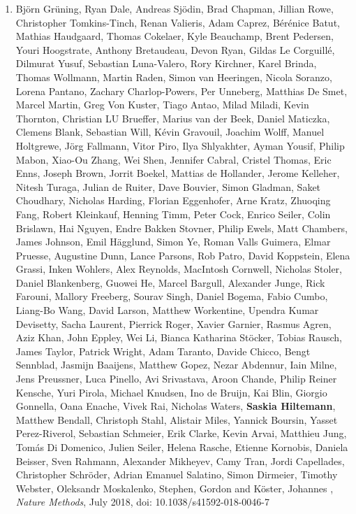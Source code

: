 \begin{enumerate}
\item Björn Grüning, Ryan  Dale, Andreas  Sjödin, Brad  Chapman, Jillian  Rowe, Christopher  Tomkins-Tinch, Renan  Valieris, Adam  Caprez, Bérénice  Batut, Mathias  Haudgaard, Thomas  Cokelaer, Kyle  Beauchamp, Brent  Pedersen, Youri  Hoogstrate, Anthony  Bretaudeau, Devon  Ryan, Gildas  Le Corguillé, Dilmurat  Yusuf, Sebastian  Luna-Valero, Rory  Kirchner, Karel  Brinda, Thomas  Wollmann, Martin  Raden, Simon  van Heeringen, Nicola  Soranzo, Lorena  Pantano, Zachary  Charlop-Powers, Per  Unneberg, Matthias  De Smet, Marcel  Martin, Greg  Von Kuster, Tiago  Antao, Milad  Miladi, Kevin  Thornton, Christian LU   Brueffer, Marius  van der Beek, Daniel  Maticzka, Clemens  Blank, Sebastian  Will, Kévin  Gravouil, Joachim  Wolff, Manuel  Holtgrewe, Jörg  Fallmann, Vitor  Piro, Ilya  Shlyakhter, Ayman  Yousif, Philip  Mabon, Xiao-Ou  Zhang, Wei  Shen, Jennifer  Cabral, Cristel  Thomas, Eric  Enns, Joseph  Brown, Jorrit  Boekel, Mattias  de Hollander, Jerome  Kelleher, Nitesh  Turaga, Julian  de Ruiter, Dave  Bouvier, Simon  Gladman, Saket  Choudhary, Nicholas  Harding, Florian  Eggenhofer, Arne  Kratz, Zhuoqing  Fang, Robert  Kleinkauf, Henning  Timm, Peter  Cock, Enrico  Seiler, Colin  Brislawn, Hai  Nguyen, Endre  Bakken Stovner, Philip  Ewels, Matt  Chambers, James  Johnson, Emil  Hägglund, Simon  Ye, Roman  Valls Guimera, Elmar  Pruesse, Augustine  Dunn, Lance  Parsons, Rob  Patro, David  Koppstein, Elena  Grassi, Inken  Wohlers, Alex  Reynolds, MacIntosh  Cornwell, Nicholas  Stoler, Daniel  Blankenberg, Guowei  He, Marcel  Bargull, Alexander  Junge, Rick  Farouni, Mallory  Freeberg, Sourav  Singh, Daniel  Bogema, Fabio  Cumbo, Liang-Bo  Wang, David  Larson, Matthew  Workentine, Upendra  Kumar Devisetty, Sacha  Laurent, Pierrick  Roger, Xavier  Garnier, Rasmus  Agren, Aziz  Khan, John  Eppley, Wei  Li, Bianca Katharina  Stöcker, Tobias  Rausch, James  Taylor, Patrick  Wright, Adam  Taranto, Davide  Chicco, Bengt  Sennblad, Jasmijn  Baaijens, Matthew  Gopez, Nezar  Abdennur, Iain  Milne, Jens  Preussner, Luca  Pinello, Avi  Srivastava, Aroon  Chande, Philip Reiner  Kensche, Yuri  Pirola, Michael  Knudsen, Ino  de Bruijn, Kai  Blin, Giorgio  Gonnella, Oana  Enache, Vivek  Rai, Nicholas  Waters, \textbf{Saskia Hiltemann}, Matthew Bendall, Christoph  Stahl, Alistair  Miles, Yannick  Boursin, Yasset  Perez-Riverol, Sebastian  Schmeier, Erik  Clarke, Kevin  Arvai, Matthieu  Jung, Tomás  Di Domenico, Julien  Seiler, Helena  Rasche, Etienne  Kornobis, Daniela  Beisser, Sven  Rahmann, Alexander  Mikheyev, Camy  Tran, Jordi  Capellades, Christopher  Schröder, Adrian Emanuel  Salatino, Simon  Dirmeier, Timothy  Webster, Oleksandr  Moskalenko, Stephen, Gordon and Köster, Johannes {\color{chaptergrey}{Bioconda: A sustainable and comprehensive software distribution for the life sciences.}}, \textit{Nature Methods}, July 2018, doi: 10.1038/s41592-018-0046-7


\end{enumerate}
